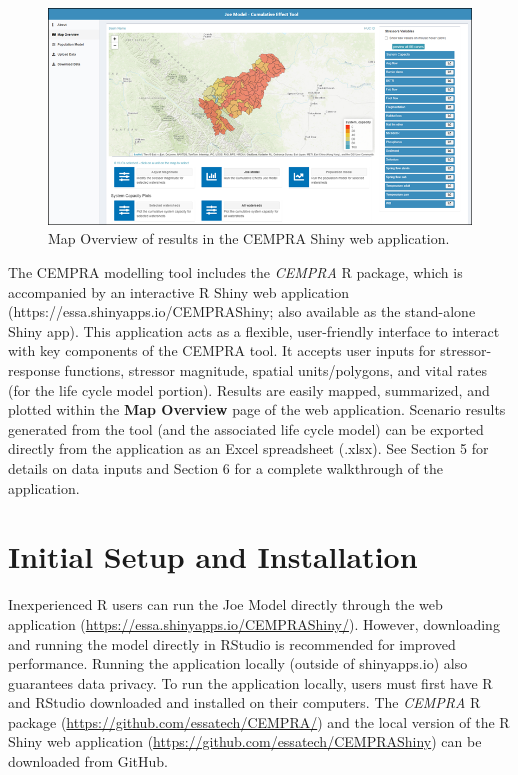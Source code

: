 \documentclass[
  letterpaper,
  DIV=11,
  numbers=noendperiod]{scrreprt}
\begin{document}
\begin{figure}

{\centering \includegraphics{images/image011.png}

}

\caption{\label{fig-figure7}Map Overview of results in the CEMPRA Shiny
web application.}

\end{figure}

The CEMPRA modelling tool includes the \emph{CEMPRA} R package, which is
accompanied by an interactive R Shiny web application
(https://essa.shinyapps.io/CEMPRAShiny; also available as the
stand-alone Shiny app). This application acts as a flexible,
user-friendly interface to interact with key components of the CEMPRA
tool. It accepts user inputs for stressor-response functions, stressor
magnitude, spatial units/polygons, and vital rates (for the life cycle
model portion). Results are easily mapped, summarized, and plotted
within the \textbf{Map Overview} page of the web application. Scenario
results generated from the tool (and the associated life cycle model)
can be exported directly from the application as an Excel spreadsheet
(.xlsx). See Section 5 for details on data inputs and Section 6 for a
complete walkthrough of the application.

\hypertarget{initial-setup-and-installation-2}{%
\section{Initial Setup and
Installation}\label{initial-setup-and-installation-2}}

Inexperienced R users can run the Joe Model directly through the web
application (\url{https://essa.shinyapps.io/CEMPRAShiny/}). However,
downloading and running the model directly in RStudio is recommended for
improved performance. Running the application locally (outside of
shinyapps.io) also guarantees data privacy. To run the application
locally, users must first have R and RStudio downloaded and installed on
their computers. The \emph{CEMPRA} R package
(\url{https://github.com/essatech/CEMPRA/}) and the local version of the
R Shiny web application (\url{https://github.com/essatech/CEMPRAShiny})
can be downloaded from GitHub.
\end{document}
